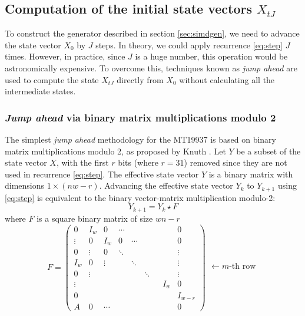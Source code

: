 \documentclass[preprint,1p,times]{elsarticle}
\begin{document}
	\subsection{Computation of the initial state vectors $X_{tJ}$}
	To construct the generator described in section \ref{sec:simdgen}, we need to advance the state vector $X_0$ by $J$ steps. In theory, we could apply recurrence \eqref{eq:step} $J$ times. However, in practice, since $J$ is a huge number, this operation would be astronomically expensive. 
	To overcome this, techniques known as \textit{jump ahead} are used to compute the state $X_{tJ}$ directly from $X_0$ without calculating all the intermediate states.
	
	\subsubsection{\textit{Jump ahead} via binary matrix multiplications modulo 2}
	\label{sec:jumpahead}
	The simplest \textit{jump ahead} methodology for the MT19937 is based on binary matrix multiplications modulo 2, as proposed by Knuth \cite{knuth}. Let $Y$ be a subset of the state vector $X$, with the first $r$ bits (where $r = 31$) removed since they are not used in recurrence \eqref{eq:step}. 
	The effective state vector $Y$ is a binary matrix with dimensions $1\times (nw-r)$. Advancing the effective state vector $Y_k$ to $Y_{k+1}$ using \eqref{eq:step} is equivalent to the binary vector-matrix multiplication modulo-2:
	\begin{equation}
		Y_{k+1} = Y_k \star F
	\end{equation}
	where $F$ is a square binary matrix of size $wn-r$
	\begin{equation}
		\label{eq:transmat}
		F = \begin{pmatrix}
			0 & I_w & 0 & \cdots & &  &  &  & 0 \\
			\vdots & 0 & I_w & 0 & \cdots & & & & 0\\
			0 & \vdots & 0 & \ddots & &&& & \vdots \\
			I_w & 0 & \vdots & & \ddots & && & \vdots \\
			0 & \vdots &  & & & \ddots & & & \vdots \\
			\vdots &  &  &  & &&& I_w & 0 \\
			0 &  &  & &  & &&&I_{w - r} \\
			A & 0 & \cdots & &  &  &&& 0
		\end{pmatrix}
		\begin{matrix}
			\\ \\ \\ \leftarrow m\text{-th row} \\ \\ \\ \\
		\end{matrix}
	\end{equation}
\end{document}
